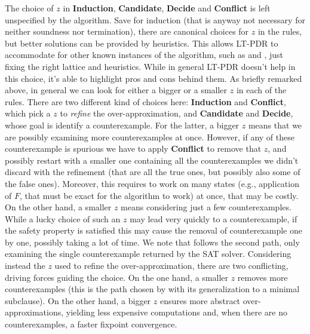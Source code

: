 The choice of $z$ in \textbf{Induction}, \textbf{Candidate}, \textbf{Decide} and \textbf{Conflict} is left unspecified by the algorithm. Save for induction (that is anyway not necessary for neither soundness nor termination), there are canonical choices for $z$ in the rules, but better solutions can be provided by heuristics. This allows LT-PDR to accommodate for other known instances of the algorithm, such as  and , just fixing the right lattice and heuristics.
While in general LT-PDR doesn't help in this choice, it's able to highlight pros and cons behind them. As briefly remarked above, in general we can look for either a bigger or a smaller $z$ in each of the rules. There are two different kind of choices here: \textbf{Induction} and \textbf{Conflict}, which pick a $z$ to \emph{refine} the over-approximation, and \textbf{Candidate} and \textbf{Decide}, whose goal is identify a counterexample.
For the latter, a bigger $z$ means that we are possibly examining more counterexamples at once. However, if any of these counterexample is spurious we have to apply \textbf{Conflict} to remove that $z$, and possibly restart with a smaller one containing all the counterexamples we didn't discard with the refinement (that are all the true ones, but possibly also some of the false ones). Moreover, this requires to work on many states (e.g., application of $F$, that must be exact for the algorithm to work) at once, that may be costly. On the other hand, a smaller $z$ means considering just a few counterexamples. While a lucky choice of such an $z$ may lead very quickly to a counterexample, if the safety property is satisfied this may cause the removal of counterexample one by one, possibly taking a lot of time. We note that  follows the second path, only examining the single counterexample returned by the SAT solver.
Considering instead the $z$ used to refine the over-approximation, there are two conflicting, driving forces guiding the choice. On the one hand, a smaller $z$ removes more counterexamples (this is the path chosen by  with its generalization to a minimal subclause). On the other hand, a bigger $z$ ensures more abstract over-approximations, yielding less expensive computations and, when there are no counterexamples, a faster fixpoint convergence.

